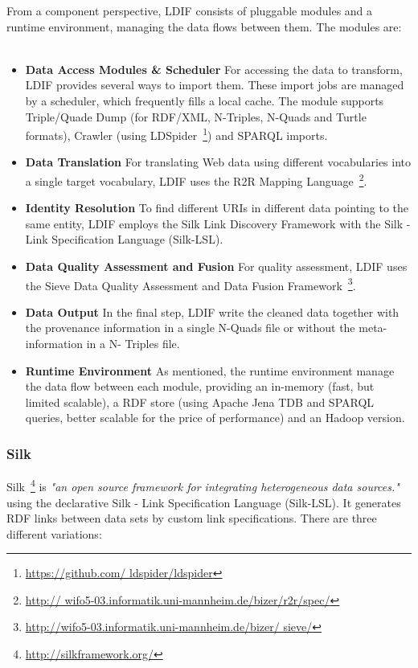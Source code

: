 From a component perspective, LDIF consists of pluggable modules and a runtime 
environment, managing the data flows between them. The modules are:~
\cite{schultz2011ldif}~\cite{schultz2012ldif}

\begin{itemize}

\item \textbf{Data Access Modules \& Scheduler}
For accessing the data to transform, LDIF provides several ways to import them. 
These import jobs are managed by a scheduler, which frequently fills a local 
cache. The module supports Triple/Quade Dump (for RDF/XML, N-Triples, N-Quads and 
Turtle formats), Crawler (using LDSpider~\footnote{\url{https://github.com/
ldspider/ldspider}}) and SPARQL imports.

\item \textbf{Data Translation}
For translating Web data using different vocabularies into a single target 
vocabulary, LDIF uses the R2R Mapping Language~\footnote{\url{http://
wifo5-03.informatik.uni-mannheim.de/bizer/r2r/spec/}}.

\item \textbf{Identity Resolution}
To find different URIs in different data pointing to the same entity, LDIF employs 
the Silk Link Discovery Framework with the Silk - Link Specification Language 
(Silk-LSL).

\item \textbf{Data Quality Assessment and Fusion}
For quality assessment, LDIF uses the Sieve Data Quality Assessment and Data 
Fusion Framework~\footnote{\url{http://wifo5-03.informatik.uni-mannheim.de/bizer/
sieve/}}.

\item \textbf{Data Output}
In the final step, LDIF write the cleaned data together with the provenance 
information in a single N-Quads file or without the meta-information in a N-
Triples file.
\item \textbf{Runtime Environment} 
As mentioned, the runtime environment manage the data flow between each module, 
providing an in-memory (fast, but limited scalable), a RDF store (using Apache 
Jena TDB and SPARQL queries, better scalable for the price of performance) and an 
Hadoop version.

\end{itemize}

\subsubsection{Silk}\label{silk}
Silk~\footnote{\url{http://silkframework.org/}} is \emph{"an open source framework 
for integrating heterogeneous data sources."} using the declarative Silk - Link 
Specification Language (Silk-LSL). It generates RDF links between data sets by 
custom link specifications. There are three different variations:~
\cite{isele2010silk}

